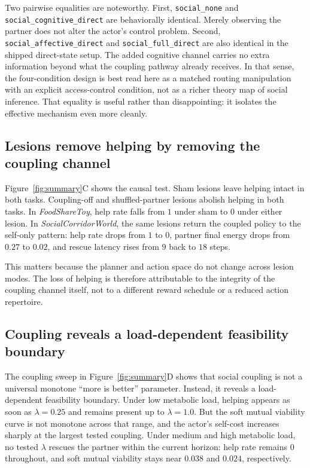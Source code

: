 \documentclass[letterpaper]{article}
\begin{document}
Two pairwise equalities are noteworthy. First, \texttt{social\_none} and \texttt{social\_cognitive\_direct} are behaviorally identical. Merely observing the partner does not alter the actor's control problem. Second, \texttt{social\_affective\_direct} and \texttt{social\_full\_direct} are also identical in the shipped direct-state setup. The added cognitive channel carries no extra information beyond what the coupling pathway already receives. In that sense, the four-condition design is best read here as a matched routing manipulation with an explicit access-control condition, not as a richer theory map of social inference. That equality is useful rather than disappointing: it isolates the effective mechanism even more cleanly.

\subsection{Lesions remove helping by removing the coupling channel}

Figure~\ref{fig:summary}C shows the causal test. Sham lesions leave helping intact in both tasks. Coupling-off and shuffled-partner lesions abolish helping in both tasks. In \emph{FoodShareToy}, help rate falls from $1$ under sham to $0$ under either lesion. In \emph{SocialCorridorWorld}, the same lesions return the coupled policy to the self-only pattern: help rate drops from $1$ to $0$, partner final energy drops from $0.27$ to $0.02$, and rescue latency rises from $9$ back to $18$ steps.

This matters because the planner and action space do not change across lesion modes. The loss of helping is therefore attributable to the integrity of the coupling channel itself, not to a different reward schedule or a reduced action repertoire.

\subsection{Coupling reveals a load-dependent feasibility boundary}

The coupling sweep in Figure~\ref{fig:summary}D shows that social coupling is not a universal monotone ``more is better'' parameter. Instead, it reveals a load-dependent feasibility boundary. Under low metabolic load, helping appears as soon as $\lambda=0.25$ and remains present up to $\lambda=1.0$. But the soft mutual viability curve is not monotone across that range, and the actor's self-cost increases sharply at the largest tested coupling. Under medium and high metabolic load, no tested $\lambda$ rescues the partner within the current horizon: help rate remains $0$ throughout, and soft mutual viability stays near $0.038$ and $0.024$, respectively.
\end{document}
